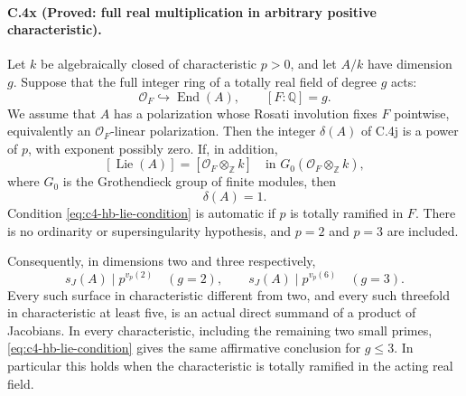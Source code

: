 \paragraph{C.4x (Proved: full real multiplication in arbitrary positive characteristic).}
Let \(k\) be algebraically closed of characteristic \(p>0\), and
let \(A/k\) have dimension \(g\). Suppose that the full integer
ring of a totally real field of degree \(g\) acts:
\[
                   \mathcal O_F\hookrightarrow\operatorname{End}(A),
                 \qquad [F:\mathbb Q]=g.
\]
We assume that \(A\) has a polarization whose Rosati involution
fixes \(F\) pointwise, equivalently an \(\mathcal O_F\)-linear
polarization. Then the integer \(\delta(A)\) of C.4j is a power
of \(p\), with exponent possibly zero. If, in addition,
\begin{equation}\label{eq:c4-hb-lie-condition}
 [\operatorname{Lie}(A)]
       =[\mathcal O_F\otimes_{\mathbb Z} k]
 \quad\text{in }G_0(\mathcal O_F\otimes_{\mathbb Z}k),
\end{equation}
where \(G_0\) is the Grothendieck group of finite modules, then
\[
                              \delta(A)=1.
\]
Condition \eqref{eq:c4-hb-lie-condition} is automatic if \(p\)
is totally ramified in \(F\).
There is no ordinarity or supersingularity hypothesis, and
\(p=2\) and \(p=3\) are included.

Consequently, in dimensions two and three respectively,
\begin{equation}\label{eq:c4-hb-splitting-bound}
 s_J(A)\mid p^{v_p(2)}
       \quad(g=2),\qquad
 s_J(A)\mid p^{v_p(6)}
       \quad(g=3).
\end{equation}
Every such surface in characteristic different from two, and
every such threefold in characteristic at least five, is an
actual direct summand of a product of Jacobians.
In every characteristic, including the remaining two small
primes, \eqref{eq:c4-hb-lie-condition} gives the same affirmative
conclusion for \(g\le3\). In particular this holds when the
characteristic is totally ramified in the acting real field.

